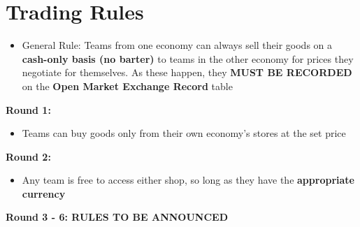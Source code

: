 \documentclass[11pt]{article}
\begin{document}
\section*{Trading Rules}

\begin{itemize}
    \item General Rule: Teams from one economy can always sell their goods on a \textbf{cash-only basis (no barter)} to teams in the other economy for prices they negotiate for themselves.
    As these happen, they \textbf{MUST BE RECORDED} on the \textbf{Open Market Exchange Record} table
\end{itemize}

\noindent \textbf{Round 1:}
\begin{itemize}
    \item Teams can buy goods only from their own economy's stores at the set price
\end{itemize}

\noindent \textbf{Round 2:}
\begin{itemize}
    \item Any team is free to access either shop, so long as they have the \textbf{appropriate currency}
\end{itemize}

\noindent \textbf{Round 3 - 6: RULES TO BE ANNOUNCED} 
\end{document}

